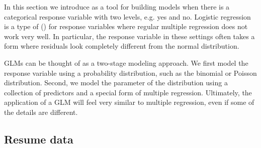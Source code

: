 
In this section we introduce 
as a tool for building models when there is a categorical
response variable with two levels, e.g. yes and no.
Logistic regression is a type of
 ()
for response variables
where regular multiple regression does not work very well.
In particular, the response variable in these settings often
takes a form where residuals look completely different from
the normal distribution.

GLMs can be thought of as a two-stage modeling approach.
We first model the response variable using a probability
distribution, such as the binomial or Poisson distribution.
Second, we model the parameter of the distribution using
a collection of predictors and a special form of multiple
regression.
Ultimately, the application of a GLM will feel very similar
to multiple regression, even if some of the details are
different.


\subsection{Resume data}


\newcommand{\resN}{4870}
\newcommand{\resCallbackProp}{0.0805}
\newcommand{\resCallbackPerc}{8.05\%}
\newcommand{\resNumPred}{8}
\newcommand{\resUniqueNames}{36}
\newcommand{\resHonorsInt}{-2.4998}
\newcommand{\resHonorsCoef}{0.8668}
\newcommand{\resHonorsIntPlusCoef}{-1.6330}
\newcommand{\resHonorsCoefSE}{0.1776}
\newcommand{\resHonorsCoefZ}{4.88}
\newcommand{\resHonorsProb}{0.163}
\newcommand{\resHonorsPerc}{16.3\%}
\newcommand{\resHonorsNotProb}{0.076}
\newcommand{\resHonorsNotPerc}{7.6\%}

